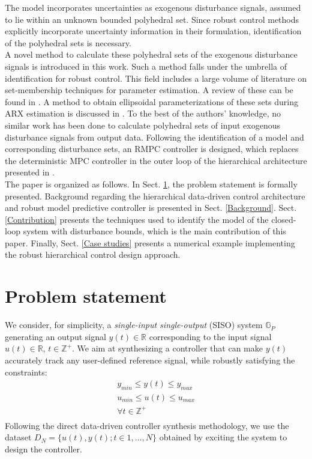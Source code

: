 \documentclass[letterpaper, 10 pt, conference]{ieeeconf}  %
\begin{document}
 The model incorporates uncertainties as exogenous disturbance signals, assumed to lie within an unknown bounded polyhedral set. Since robust control methods explicitly incorporate uncertainty information in their formulation, identification of the polyhedral sets is necessary. \\
 \indent A novel method to calculate these polyhedral sets of the exogenous disturbance signals is introduced in this work. Such a method falls under the umbrella of identification for robust control.
This field includes a large volume of literature on set-membership techniques for parameter estimation. A review of these can be found in \cite{WALTER1990449}. A method to obtain ellipsoidal parameterizations of these sets during ARX estimation is discussed in \cite{7330793}. To the best of the authors' knowledge, no similar work has been done to calculate polyhedral sets of input exogenous disturbance signals from output data.
  Following the identification of a model and corresponding disturbance sets, an RMPC controller is designed, which replaces the deterministic MPC controller in the outer loop of the hierarchical architecture presented in \cite{7932940}.
 \\ \indent
 The paper is organized as follows. In Sect. \ref{Problem statement}, the problem statement is formally presented. Background regarding the hierarchical data-driven control architecture and robust model predictive controller is presented in Sect. \ref{Background}. Sect. \ref{Contribution} presents the techniques used to identify the model of the closed-loop system with disturbance bounds, which is the main contribution of this paper. Finally, Sect. \ref{Case studies} presents a numerical example implementing the robust hierarchical control design approach. 

\section{Problem statement}
\label{Problem statement}
We consider, for simplicity, a \textit{single-input single-output} (SISO) system $\mathbb{G}_P$ generating an output signal $y(t) \in \mathbb{R}$ corresponding to the input signal $u(t) \in \mathbb{R}$, $t \in \mathbb{Z}^+$. We aim at synthesizing a controller that can make $y(t)$ accurately track any user-defined reference signal, while robustly satisfying the constraints:
\begin{equation} 
\begin{matrix}
y_{min}\leq y(t) \leq y_{max}\\
u_{min}\leq u(t) \leq u_{max} \\
\forall t \in \mathbb{Z}^+\\
\end{matrix}
\label{constraints}
\end{equation} 
Following the direct data-driven controller synthesis methodology, we use the dataset $D_{N}=\{u(t),y(t);t\in{1,...,N}\}$ obtained by exciting the system to design the controller.
\end{document}
